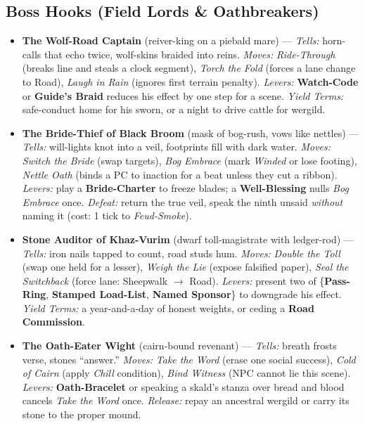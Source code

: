 \subsection*{Boss Hooks (Field Lords \& Oathbreakers)}
\label{sec:ubral-bosses}

\begin{itemize}
  \item \textbf{The Wolf-Road Captain} (reiver-king on a piebald mare) --- \emph{Tells:} horn-calls that echo twice, wolf-skins braided into reins. \emph{Moves:} \emph{Ride-Through} (breaks line and steals a clock segment), \emph{Torch the Fold} (forces a lane change to Road), \emph{Laugh in Rain} (ignores first terrain penalty). \emph{Levers:} \textbf{Watch-Code} or \textbf{Guide's Braid} reduces his effect by one step for a scene. \emph{Yield Terms:} safe-conduct home for his sworn, or a night to drive cattle for wergild.
  \item \textbf{The Bride-Thief of Black Broom} (mask of bog-rush, vows like nettles) --- \emph{Tells:} will-lights knot into a veil, footprints fill with dark water. \emph{Moves:} \emph{Switch the Bride} (swap targets), \emph{Bog Embrace} (mark \emph{Winded} or lose footing), \emph{Nettle Oath} (binds a PC to inaction for a beat unless they cut a ribbon). \emph{Levers:} play a \textbf{Bride-Charter} to freeze blades; a \textbf{Well-Blessing} nulls \emph{Bog Embrace} once. \emph{Defeat:} return the true veil, speak the ninth unsaid \emph{without} naming it (cost: 1 tick to \emph{Feud-Smoke}).
  \item \textbf{Stone Auditor of Khaz-Vurim} (dwarf toll-magistrate with ledger-rod) --- \emph{Tells:} iron nails tapped to count, road studs hum. \emph{Moves:} \emph{Double the Toll} (swap one held \Diamond{} for a lesser), \emph{Weigh the Lie} (expose falsified paper), \emph{Seal the Switchback} (force lane: Sheepwalk $\rightarrow$ Road). \emph{Levers:} present two of \{\textbf{Pass-Ring}, \textbf{Stamped Load-List}, \textbf{Named Sponsor}\} to downgrade his effect. \emph{Yield Terms:} a year-and-a-day of honest weights, or ceding a \textbf{Road Commission}.
  \item \textbf{The Oath-Eater Wight} (cairn-bound revenant) --- \emph{Tells:} breath frosts verse, stones “answer.” \emph{Moves:} \emph{Take the Word} (erase one social success), \emph{Cold of Cairn} (apply \emph{Chill} condition), \emph{Bind Witness} (NPC cannot lie this scene). \emph{Levers:} \textbf{Oath-Bracelet} or speaking a skald’s stanza over bread and blood cancels \emph{Take the Word} once. \emph{Release:} repay an ancestral wergild or carry its stone to the proper mound.

\end{itemize}
